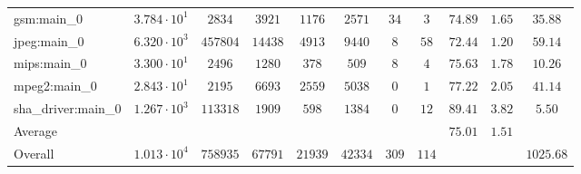 \begin{tabular}{|l|c|c|c|c|c|c|c|c|c|c|}
gsm:main\_0             & $ 3.784 \cdot 10^{1} $ & $ 2834   $ & $ 3921  $ & $ 1176  $ & $ 2571  $ & $ 34  $ & $ 3   $ & $ 74.89       $ & $ 1.65    $ & $ 35.88   $ \\
jpeg:main\_0            & $ 6.320 \cdot 10^{3} $ & $ 457804 $ & $ 14438 $ & $ 4913  $ & $ 9440  $ & $ 8   $ & $ 58  $ & $ 72.44       $ & $ 1.20    $ & $ 59.14   $ \\
mips:main\_0            & $ 3.300 \cdot 10^{1} $ & $ 2496   $ & $ 1280  $ & $ 378   $ & $ 509   $ & $ 8   $ & $ 4   $ & $ 75.63       $ & $ 1.78    $ & $ 10.26   $ \\
mpeg2:main\_0           & $ 2.843 \cdot 10^{1} $ & $ 2195   $ & $ 6693  $ & $ 2559  $ & $ 5038  $ & $ 0   $ & $ 1   $ & $ 77.22       $ & $ 2.05    $ & $ 41.14   $ \\
sha\_driver:main\_0     & $ 1.267 \cdot 10^{3} $ & $ 113318 $ & $ 1909  $ & $ 598   $ & $ 1384  $ & $ 0   $ & $ 12  $ & $ 89.41       $ & $ 3.82    $ & $ 5.50    $ \\
\hline
Average                 & $                    $ & $        $ & $       $ & $       $ & $       $ & $     $ & $     $ & $ 75.01       $ & $ 1.51    $ & $         $ \\
\hline
Overall                 & $ 1.013 \cdot 10^{4} $ & $ 758935 $ & $ 67791 $ & $ 21939 $ & $ 42334 $ & $ 309 $ & $ 114 $ & $             $ & $         $ & $ 1025.68 $ \\
\hline
\end{tabular}
